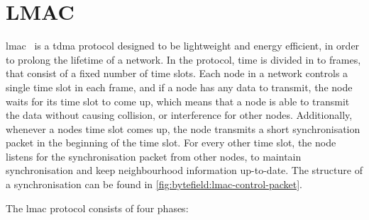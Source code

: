 \section{LMAC}\label{sec:lmacc}
\gls{lmac}~\cite{paper:lmac_protocol}\cite{paper:lmac_verification} is a \gls{tdma} protocol designed to be
lightweight and energy efficient, in order to prolong the lifetime of a network. In the protocol, time is
divided in to frames, that consist of a fixed number of time slots. Each node in a network controls a single
time slot in each frame, and if a node has any data to transmit, the node waits for its time slot to come up,
which means that a node is able to transmit the data without causing collision, or interference for other
nodes. Additionally, whenever a nodes time slot comes up, the node transmits a short synchronisation packet
in the beginning of the time slot. For every other time slot, the node listens for the synchronisation packet
from other nodes, to maintain synchronisation and keep neighbourhood information up-to-date. The structure of
a synchronisation can be found in \autoref{fig:bytefield:lmac-control-packet}. \medbreak

The \gls{lmac} protocol consists of four phases:

